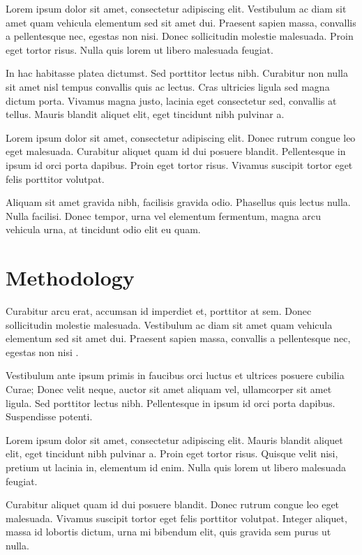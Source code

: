 \documentclass[12pt,twocolumn]{article}
\begin{document}
Lorem ipsum dolor sit amet, consectetur adipiscing elit. Vestibulum ac diam sit amet quam vehicula elementum sed sit amet dui. Praesent sapien massa, convallis a pellentesque nec, egestas non nisi. Donec sollicitudin molestie malesuada. Proin eget tortor risus. Nulla quis lorem ut libero malesuada feugiat.

In hac habitasse platea dictumst. Sed porttitor lectus nibh. Curabitur non nulla sit amet nisl tempus convallis quis ac lectus. Cras ultricies ligula sed magna dictum porta. Vivamus magna justo, lacinia eget consectetur sed, convallis at tellus. Mauris blandit aliquet elit, eget tincidunt nibh pulvinar a.

Lorem ipsum dolor sit amet, consectetur adipiscing elit. Donec rutrum congue leo eget malesuada. Curabitur aliquet quam id dui posuere blandit. Pellentesque in ipsum id orci porta dapibus. Proin eget tortor risus. Vivamus suscipit tortor eget felis porttitor volutpat.

Aliquam sit amet gravida nibh, facilisis gravida odio. Phasellus quis lectus nulla. Nulla facilisi. Donec tempor, urna vel elementum fermentum, magna arcu vehicula urna, at tincidunt odio elit eu quam.


\section{Methodology}

Curabitur arcu erat, accumsan id imperdiet et, porttitor at sem. Donec sollicitudin molestie malesuada. Vestibulum ac diam sit amet quam vehicula elementum sed sit amet dui. Praesent sapien massa, convallis a pellentesque nec, egestas non nisi \citet{krizhevsky2012imagenet}.

Vestibulum ante ipsum primis in faucibus orci luctus et ultrices posuere cubilia Curae; Donec velit neque, auctor sit amet aliquam vel, ullamcorper sit amet ligula. Sed porttitor lectus nibh. Pellentesque in ipsum id orci porta dapibus. Suspendisse potenti.

Lorem ipsum dolor sit amet, consectetur adipiscing elit. Mauris blandit aliquet elit, eget tincidunt nibh pulvinar a. Proin eget tortor risus. Quisque velit nisi, pretium ut lacinia in, elementum id enim. Nulla quis lorem ut libero malesuada feugiat.

Curabitur aliquet quam id dui posuere blandit. Donec rutrum congue leo eget malesuada. Vivamus suscipit tortor eget felis porttitor volutpat. Integer aliquet, massa id lobortis dictum, urna mi bibendum elit, quis gravida sem purus ut nulla.
\end{document}
